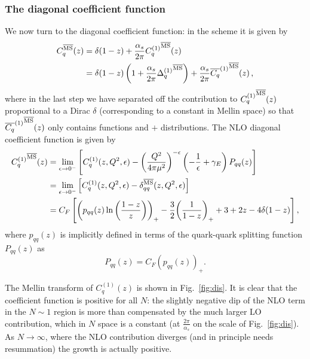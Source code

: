 \subsubsection{The diagonal coefficient function}
\label{sec:diag}
We now turn to the diagonal coefficient function: in the \msbar{} scheme
it is given by
\begin{align}\label{eq:cq}
  C_q^{{\overline{\textrm{{MS}}}}}(z)&=\delta(1-z)+ \frac{\alpha_s}{2\pi}
  {C^{(1)}_q}^{{\overline{\textrm{{MS}}}}}(z)\\
    &=\delta(1-z) \left(1+\frac{\alpha_s}{2\pi} {\Delta^{(1)}_q}^{{\overline{\textrm{{MS}}}}}\right)
  +\frac{\alpha_s}{2\pi}  {\overline{C_{q}}^{(1)}}^{{\overline{\textrm{{MS}}}}}(z) \,,\label{eq:cqnodist}
\end{align}
where in the last step we have separated off the contribution to
$ {C^{(1)}_q}^{{\overline{\textrm{{MS}}}}}(z)$ proportional to a Dirac $\delta$
(corresponding to a constant in Mellin space) so that
${\overline{C_{q}}^{(1)}}^{{\overline{\textrm{{MS}}}}}(z)$ only contains  functions and
$+$ distributions.
The NLO diagonal
coefficient function is given by
\begin{align}
{C^{(1)}_q}^{{\overline{\textrm{{MS}}}}}(z)&=
\lim_{\epsilon\to
  0^-}\left[C_{q}^{(1)}(z,Q^2,\epsilon) - \left(\frac{Q^2}{4\pi
      \mu^2}\right)^{-\epsilon} \left(-\frac 1
    {\epsilon}+\gamma_E\right) P_{qq}(z)\right]\label{eq:cqren}\\
&=\lim_{\epsilon\to0^-}\left[ {C_q^{(1)}}(z,Q^2,\epsilon)
    -\delta_{qq}^{{\overline{\textrm{{MS}}}}}(z,Q^2,\epsilon)\right]\label{eq:renormq}\\
&= C_F\left[ \left(p_{qq}(z)
    \ln\left(\frac{1-z}{z}\right) \right)_+ - \frac {3}{2}{ \left( \frac{1}{1-z} \right)_+ } + 3
    + 2 z - 4 \delta(1-z)\right]\label{eq:cqnlo},
\end{align}
where 
$p_{qq}(z)$ is implicitly defined in terms of the quark-quark
splitting function $P_{qq}(z)$ as
\begin{equation}\label{eq:pqq}
  P_{qq}(z)= C_F\left(p_{qq}(z)\right)_+.
\end{equation}


The Mellin transform of $C^{(1)}_q(z)$ is shown in
Fig.~\ref{fig:dis}. It is clear that the coefficient function is
positive for all $N$: the slightly negative dip of the NLO term
in the $N\sim 1$
region is more than compensated by the much larger LO contribution,
which in $N$ space is a constant (at $\frac{2 \pi}{\alpha_s}$ on the
scale of Fig.~\ref{fig:dis}). 
As $N\to\infty$, where the NLO contribution diverges (and in
principle needs resummation) the growth is actually positive.

